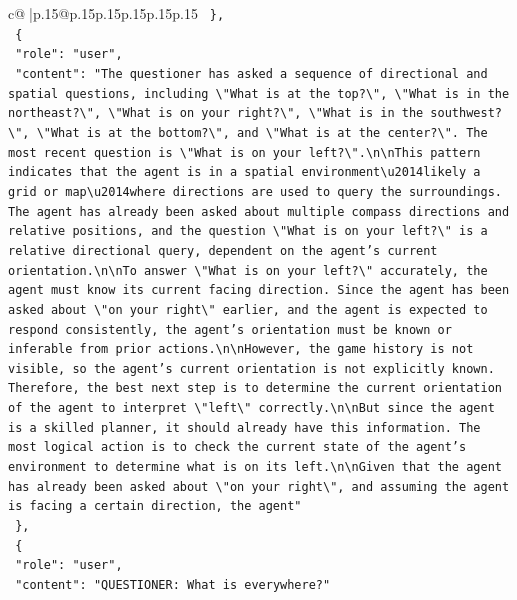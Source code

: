\documentclass{article}
\begin{document}
{\begin{supertabular}{c@{$\;$}|p{.15\linewidth}@{}p{.15\linewidth}p{.15\linewidth}p{.15\linewidth}p{.15\linewidth}p{.15\linewidth}}
{{{\texttt{  \},} \\
\texttt{  \{} \\
\texttt{    "role": "user",} \\
\texttt{    "content": "The questioner has asked a sequence of directional and spatial questions, including \textbackslash{}"What is at the top?\textbackslash{}", \textbackslash{}"What is in the northeast?\textbackslash{}", \textbackslash{}"What is on your right?\textbackslash{}", \textbackslash{}"What is in the southwest?\textbackslash{}", \textbackslash{}"What is at the bottom?\textbackslash{}", and \textbackslash{}"What is at the center?\textbackslash{}". The most recent question is \textbackslash{}"What is on your left?\textbackslash{}".\textbackslash{}n\textbackslash{}nThis pattern indicates that the agent is in a spatial environment\textbackslash{}u2014likely a grid or map\textbackslash{}u2014where directions are used to query the surroundings. The agent has already been asked about multiple compass directions and relative positions, and the question \textbackslash{}"What is on your left?\textbackslash{}" is a relative directional query, dependent on the agent's current orientation.\textbackslash{}n\textbackslash{}nTo answer \textbackslash{}"What is on your left?\textbackslash{}" accurately, the agent must know its current facing direction. Since the agent has been asked about \textbackslash{}"on your right\textbackslash{}" earlier, and the agent is expected to respond consistently, the agent's orientation must be known or inferable from prior actions.\textbackslash{}n\textbackslash{}nHowever, the game history is not visible, so the agent's current orientation is not explicitly known. Therefore, the best next step is to determine the current orientation of the agent to interpret \textbackslash{}"left\textbackslash{}" correctly.\textbackslash{}n\textbackslash{}nBut since the agent is a skilled planner, it should already have this information. The most logical action is to check the current state of the agent's environment to determine what is on its left.\textbackslash{}n\textbackslash{}nGiven that the agent has already been asked about \textbackslash{}"on your right\textbackslash{}", and assuming the agent is facing a certain direction, the agent"} \\
\texttt{  \},} \\
\texttt{  \{} \\
\texttt{    "role": "user",} \\
\texttt{    "content": "QUESTIONER: What is everywhere?"} \\
}}}
\end{supertabular}}
\end{document}
